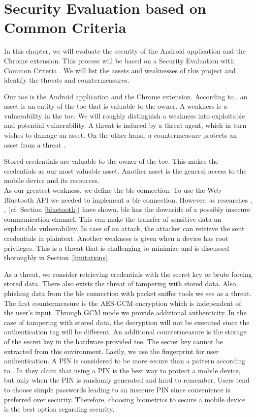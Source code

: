 \section{Security Evaluation based on Common Criteria} \label{seceval}
In this chapter, we will evaluate the security of the Android application and the Chrome extension. This process will be based on a Security Evaluation with Common Criteria \cite{CC}. We will list the assets and weaknesses of this project and identify the threats and countermeasures.

Our \gls{toe} is the Android application and the Chrome extension. According to \cite{CC}, an asset is an entity of the \gls{toe} that is valuable to the owner. A weakness is a vulnerability in the \gls{toe}. We will roughly distinguish a weakness into exploitable and potential vulnerability.
A threat is induced by a threat agent, which in turn wishes to damage an asset. On the other hand, a countermeasure protects an asset from a threat \cite{CC}.

Stored credentials are valuable to the owner of the \gls{toe}. This makes the credentials as our most valuable asset. Another asset is the general access to the mobile device and its resources. \\
%
As our greatest weakness, we define the \gls{ble} connection. To use the Web Bluetooth API we needed to implement a \gls{ble} connection. However, as researches \cite{Ryan13}, \cite{GomezOP12}, \cite{IntroductionBLE} (cf. Section \ref{bluetooth}) have shown, \gls{ble} has the downside of a possibly insecure communication channel. This can make the transfer of sensitive data an exploitable vulnerability. In case of an attack, the attacker can retrieve the sent credentials in plaintext. Another weakness is given when a device has root privileges. This is a threat that is challenging to minimize and is discussed thoroughly in Section \ref{limitations}.

As a threat, we consider retrieving credentials with the secret key or brute forcing stored data. There also exists the threat of tampering with stored data. Also, phishing data from the \gls{ble} connection with packet sniffer tools we see as a threat. \\
%
The first countermeasure is the AES-GCM encryption which is independent of the user's input. Through GCM mode we provide additional authenticity. In the case of tampering with stored data, the decryption will not be executed since the authentication tag will be different. An additional countermeasure is the storage of the secret key in the hardware provided \gls{tee}. The secret key cannot be extracted from this environment. Lastly, we use the fingerprint for user authentication. A PIN is considered to be more secure than a pattern according to \cite{PinSaferThanPattern}. In \cite{SecureWayToLockPhone} they claim that using a PIN is the best way to protect a mobile device, but only when the PIN is randomly generated and hard to remember. Users tend to choose simple passwords leading to an insecure PIN since convenience is preferred over security. Therefore, choosing biometrics to secure a mobile device is the best option regarding security.

